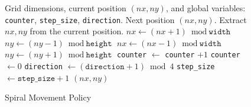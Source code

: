 \documentclass{article}
\begin{document}
\begin{figure}[H]
    \centering
    \begin{minipage}{0.5\textwidth}
        \begin{algorithm}[H]
            \caption{Spiral Movement Policy}\label{alg:spiral}
            \begin{algorithmic}[1]
                \Require Grid dimensions, current position $(nx, ny)$, and global variables: \texttt{counter}, \texttt{step\_size}, \texttt{direction}.
                \Ensure Next position $(nx, ny)$.
                \State Extract $nx, ny$ from the current position.
                 
                \State $nx \gets (nx + 1) \bmod \texttt{width}$
                 
                \State $ny \gets (ny - 1) \bmod \texttt{height}$
                 
                \State $nx \gets (nx - 1) \bmod \texttt{width}$
                 
                \State $ny \gets (ny + 1) \bmod \texttt{height}$
                \EndIf
                \State \texttt{counter} $\gets$ \texttt{counter} $+ 1$
                \State \texttt{counter} $\gets 0$
                \State \texttt{direction} $\gets (\texttt{direction} + 1) \bmod 4$
                \State \texttt{step\_size} $\gets \texttt{step\_size} + 1$
                \EndIf
                \EndIf
                \State \Return $(nx, ny)$
            \end{algorithmic}
        \end{algorithm}


\end{minipage}
\end{figure}
\end{document}
